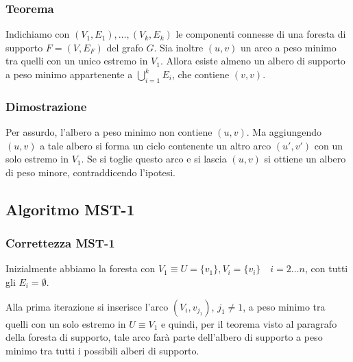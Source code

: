 \documentclass[../template]{subfiles}
\begin{document}
\subsubsection{Teorema}
Indichiamo con $(V_1, E_1),\ldots ,(V_k, E_k)$ le componenti connesse di una foresta di supporto
$F = (V, E_F)$ del grafo $G$. Sia inoltre $(u, v)$ un arco a peso minimo tra quelli con un unico estremo
in $V_1$. Allora esiste almeno un albero di supporto a peso minimo appartenente a $\bigcup^k_{i=1} E_i$,
che contiene $(v, v)$.

\subsubsection{Dimostrazione}
Per assurdo, l'albero a peso minimo non contiene $(u, v)$. Ma aggiungendo $(u, v)$ a tale albero si forma un
ciclo contenente un altro arco $(u', v')$  con un solo estremo in $V_1$.
Se si toglie questo arco e si lascia $(u, v)$ si ottiene un albero di peso minore,
contraddicendo l'ipotesi.

\subsection{Algoritmo MST-1}
\begin{center}
\end{center}

\subsubsection{Correttezza MST-1}
Inizialmente abbiamo la foresta con $V_1 \equiv U = \{v_1\}, V_i = \{v_i\} \quad i=2\ldots n$, con tutti gli $E_i = \emptyset$.

Alla prima iterazione si inserisce l'arco $(V_i, v_{j_1})$, $j_1 \neq 1$, a peso minimo tra quelli con un solo estremo in $U \equiv V_1$
e quindi, per il teorema visto al paragrafo della foresta di supporto, tale arco farà parte dell'albero di supporto a peso minimo
tra tutti i possibili alberi di supporto.
\end{document}
